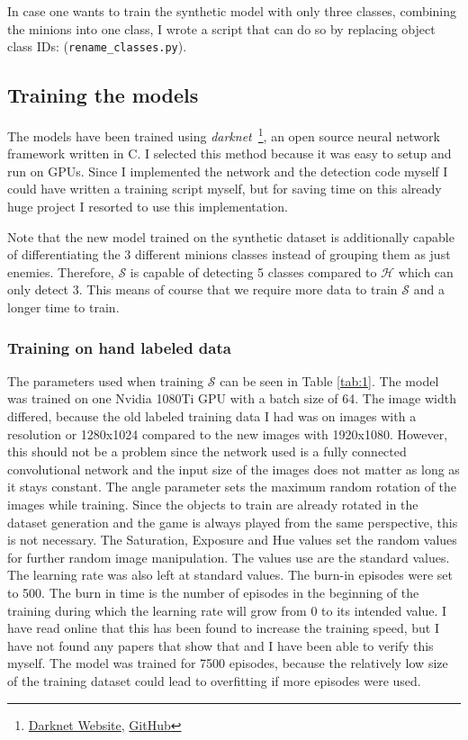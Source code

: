 In case one wants to train the synthetic model with only three classes, combining the minions into one class, I wrote a script that can do so by replacing object class IDs: (\texttt{rename\_classes.py}).

\subsection{Training the models}
The models have been trained using \textit{darknet}~\cite{darknet13}\footnote{\href{https://pjreddie.com/darknet/}{Darknet Website}, \href{https://github.com/pjreddie/darknet}{GitHub}}, an open source neural network framework written in C.
I selected this method because it was easy to setup and run on GPUs. Since I implemented the network and the detection code myself I could have written a training script myself, but for saving time on this already huge project I resorted to use this implementation.

Note that the new model trained on the synthetic dataset is additionally capable of differentiating the 3 different minions classes instead of grouping them as just enemies.
Therefore, $\mathcal{S}$ is capable of detecting 5 classes compared to $\mathcal{H}$ which can only detect 3.
This means of course that we require more data to train $\mathcal{S}$ and a longer time to train.

\subsubsection{Training on hand labeled data}
The parameters used when training $\mathcal{S}$ can be seen in Table \ref{tab:1}.
The model was trained on one Nvidia 1080Ti GPU with a batch size of 64. The image width differed, because the old labeled training data I had was on images with a resolution or 1280x1024 compared to the new images with 1920x1080.
However, this should not be a problem since the network used is a fully connected convolutional network and the input size of the images does not matter as long as it stays constant.
The angle parameter sets the maximum random rotation of the images while training.
Since the objects to train are already rotated in the dataset generation and the game is always played from the same perspective, this is not necessary.
The Saturation, Exposure and Hue values set the random values for further random image manipulation.
The values use are the standard values.
The learning rate was also left at standard values.
The burn-in episodes were set to 500.
The burn in time is the number of episodes in the beginning of the training during which the learning rate will grow from 0 to its intended value.
I have read online that this has been found to increase the training speed, but I have not found any papers that show that and I have been able to verify this myself.
The model was trained for 7500 episodes, because the relatively low size of the training dataset could lead to overfitting if more episodes were used.

